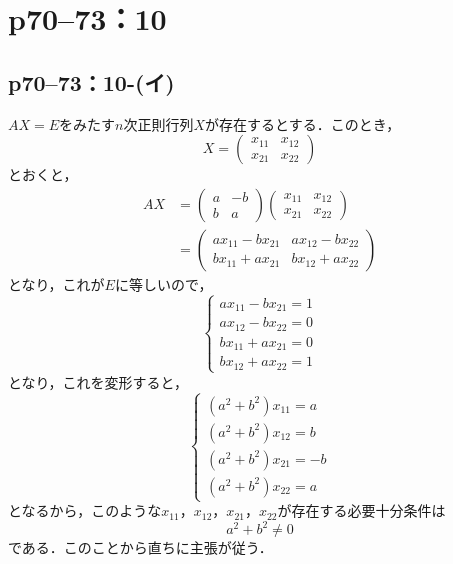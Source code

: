 \section*{p70--73：10}

\subsection*{p70--73：10-(イ)}

\begin{tproof}
  $AX=E$をみたす$n$次正則行列$X$が存在するとする．このとき，
  \[
    X = \begin{pmatrix} x_{11} & x_{12} \\ x_{21} & x_{22} \end{pmatrix}
  \]
  とおくと，
  \begin{align*}
    AX & = \begin{pmatrix} a & -b \\ b & a \end{pmatrix} \begin{pmatrix} x_{11} & x_{12} \\ x_{21} & x_{22} \end{pmatrix} \\
       & = \begin{pmatrix} ax_{11}-bx_{21} & ax_{12}-bx_{22} \\ bx_{11}+ax_{21} & bx_{12}+ax_{22} \end{pmatrix}
  \end{align*}
  となり，これが$E$に等しいので，
  \[
    \begin{cases}
      ax_{11}-bx_{21} =1 \\
      ax_{12}-bx_{22} =0 \\
      bx_{11}+ax_{21} =0 \\
      bx_{12}+ax_{22} =1
    \end{cases}
  \]
  となり，これを変形すると，
  \[
    \begin{cases}
      (a^2+b^2) x_{11} = a \\
      (a^2+b^2) x_{12} = b \\
      (a^2+b^2) x_{21}=-b  \\
      (a^2+b^2) x_{22} = a
    \end{cases}
  \]
  となるから，このような$x_{11}$，$x_{12}$，$x_{21}$，$x_{22}$が存在する必要十分条件は
  \[
    a^2 + b^2 \ne 0
  \]
  である．このことから直ちに主張が従う．
\end{tproof}




